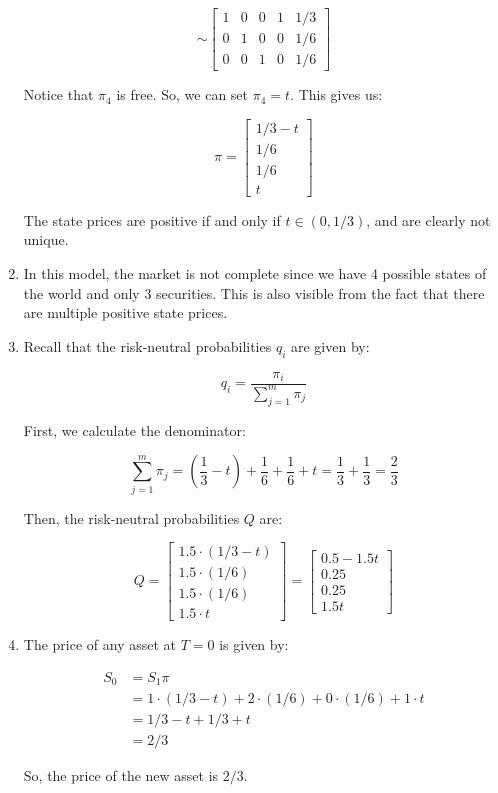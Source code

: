 \documentclass[a4paper]{article}
\begin{document}
\begin{enumerate}[label=(\alph*)]
    \[ \sim \left[\begin{array}{cccc|c}
        1 & 0 & 0 & 1 & 1/3 \\ 
        0 & 1 & 0 & 0 & 1/6 \\ 
        0 & 0 & 1 & 0 & 1/6
    \end{array}\right] \]


    Notice that $\pi_{4}$ is free. So, we can set $\pi_{4} = t$. This gives us:

    \[ \pi = \begin{bmatrix} 1/3 - t \\ 1/6 \\ 1/6 \\ t \end{bmatrix} \]

    The state prices are positive if and only if $t \in (0, 1/3)$, and are clearly not unique.


    \vspace{10mm}
    \item In this model, the market is not complete since we have 4 possible states of the world and only 3 securities. This is also visible from the fact that there are multiple positive state prices.
    
    \vspace{10mm}
    \item Recall that the risk-neutral probabilities $q_{i}$ are given by:

    \[ q_{i} = \frac{\pi_{i}}{\sum_{j=1}^{m} \pi_{j}} \]

    First, we calculate the denominator:

    \[ \sum_{j=1}^{m} \pi_{j} = \left(\frac{1}{3} - t\right) + \frac{1}{6} + \frac{1}{6} + t = \frac{1}{3} + \frac{1}{3} = \frac{2}{3} \]

    Then, the risk-neutral probabilities $Q$ are:

    \[ Q = \begin{bmatrix} 1.5 \cdot (1/3 - t) \\ 1.5 \cdot (1/6) \\ 1.5 \cdot (1/6) \\ 1.5 \cdot t \end{bmatrix} = \begin{bmatrix} 0.5 - 1.5t \\ 0.25 \\ 0.25 \\ 1.5t \end{bmatrix} \]

    \vspace{5mm}
    \item The price of any asset at $T = 0$ is given by:

    \begin{align*}
        S_{0} &= S_{1} \pi \\
              &= 1 \cdot (1/3 - t) + 2 \cdot (1/6) + 0 \cdot (1/6) + 1 \cdot t \\
              &= 1/3 - t + 1/3 + t \\
              &= 2/3
    \end{align*}

    So, the price of the new asset is $2/3$.
\end{enumerate}
\end{document}
